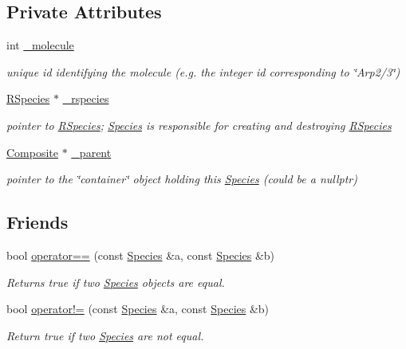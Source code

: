 \subsection*{Private Attributes}
\begin{DoxyCompactItemize}
\item 
int \hyperlink{classSpecies_a2cd51e66d421793bc3a8df9a7b0aa7d6}{\+\_\+molecule}
\begin{DoxyCompactList}\small\item\em unique id identifying the molecule (e.\+g. the integer id corresponding to \char`\"{}\+Arp2/3\char`\"{}) \end{DoxyCompactList}\item 
\hyperlink{classRSpecies}{R\+Species} $\ast$ \hyperlink{classSpecies_a8267607e66889feba64d1c00674337af}{\+\_\+rspecies}
\begin{DoxyCompactList}\small\item\em pointer to \hyperlink{classRSpecies}{R\+Species}; \hyperlink{classSpecies}{Species} is responsible for creating and destroying \hyperlink{classRSpecies}{R\+Species} \end{DoxyCompactList}\item 
\hyperlink{classComposite}{Composite} $\ast$ \hyperlink{classSpecies_a747392355a5d95f5dfd769a56076f538}{\+\_\+parent}
\begin{DoxyCompactList}\small\item\em pointer to the \char`\"{}container\char`\"{} object holding this \hyperlink{classSpecies}{Species} (could be a nullptr) \end{DoxyCompactList}\end{DoxyCompactItemize}
\subsection*{Friends}
\begin{DoxyCompactItemize}
\item 
bool \hyperlink{classSpecies_a22987c5719b74c50465256ea5b9d80bf}{operator==} (const \hyperlink{classSpecies}{Species} \&a, const \hyperlink{classSpecies}{Species} \&b)
\begin{DoxyCompactList}\small\item\em Returns true if two \hyperlink{classSpecies}{Species} objects are equal. \end{DoxyCompactList}\item 
bool \hyperlink{classSpecies_aff630d716711fbbab3bc7f598230316b}{operator!=} (const \hyperlink{classSpecies}{Species} \&a, const \hyperlink{classSpecies}{Species} \&b)
\begin{DoxyCompactList}\small\item\em Return true if two \hyperlink{classSpecies}{Species} are not equal. \end{DoxyCompactList}\end{DoxyCompactItemize}


